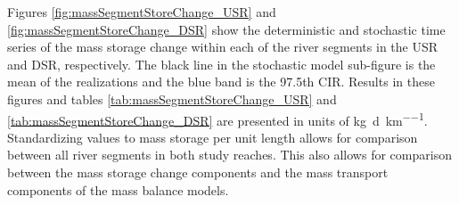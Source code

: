 \begin{linenumbers}

Figures \ref{fig:massSegmentStoreChange_USR} and \ref{fig:massSegmentStoreChange_DSR} show the deterministic and stochastic time series of the mass storage change within each of the river segments in the USR and DSR, respectively.  The black line in the stochastic model sub-figure is the mean of the realizations and the blue band is the 97.5th CIR.   Results in these figures and tables \ref{tab:massSegmentStoreChange_USR} and \ref{tab:massSegmentStoreChange_DSR} are presented in units of \si{\kilo\gram\per\day\per\kilo\meter}.  Standardizing values to mass storage per unit length allows for comparison between all river segments in both study reaches.  This also allows for comparison between the mass storage change components and the mass transport components of the mass balance models.


\end{linenumbers}
